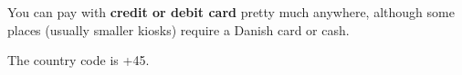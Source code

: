 You can pay with \textbf{credit or debit card} pretty much anywhere, although some places (usually smaller
kiosks) require a Danish card or cash.

The country code is +45.

%
%


